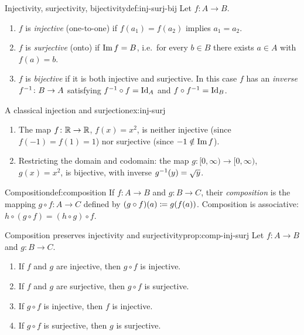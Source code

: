 \begin{definition}{Injectivity, surjectivity, bijectivity}{def:inj-surj-bij}
Let $f\colon A\to B$.
\begin{enumerate}[label=(\roman*)]
  \item $f$ is \emph{injective} (one-to-one) if
    $f(a_1)=f(a_2)$ implies $a_1=a_2$.
  \item $f$ is \emph{surjective} (onto) if
    $\operatorname{Im} f = B$, i.e.\ for every $b\in B$ there exists $a\in A$ with $f(a)=b$.
  \item $f$ is \emph{bijective} if it is both injective
    and surjective. In this case $f$ has an \emph{inverse}
    ${f}^{-1}\colon B\to A$ satisfying ${f}^{-1}\circ f = \operatorname{Id}_A$ and
    $f\circ{f}^{-1} = \operatorname{Id}_B$.
\end{enumerate}
\end{definition}

\begin{example}{A classical injection and surjection}{ex:inj-surj}
\begin{enumerate}[label=(\alph*)]
  \item The map $f\colon{\mathbb{R}}\to{\mathbb{R}}$, $f(x)=x^2$, is neither injective
    (since $f(-1)=f(1)=1$) nor surjective (since $-1\notin\operatorname{Im} f$).
  \item Restricting the domain and codomain: the map
    $g\colon [0,\infty)\to [0,\infty)$, $g(x)=x^2$, is bijective, with
    inverse ${g}^{-1}(y)=\sqrt{y}$.
\end{enumerate}
\end{example}

\begin{definition}{Composition}{def:composition}
If $f\colon A\to B$ and $g\colon B\to C$, their \emph{composition}
is the mapping $g\circ f\colon A\to C$ defined by $(g\circ f)(a) \coloneqq g(f(a))$.
Composition is associative: $h\circ(g\circ f)=(h\circ g)\circ f$.
\end{definition}

\begin{proposition}{Composition preserves injectivity and surjectivity}{prop:comp-inj-surj}
Let $f\colon A\to B$ and $g\colon B\to C$.
\begin{enumerate}[label=(\roman*)]
  \item If $f$ and $g$ are injective, then $g\circ f$ is injective.
  \item If $f$ and $g$ are surjective, then $g\circ f$ is surjective.
  \item If $g\circ f$ is injective, then $f$ is injective.
  \item If $g\circ f$ is surjective, then $g$ is surjective.
\end{enumerate}
\end{proposition}

